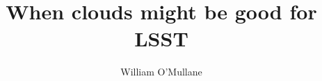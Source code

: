\documentclass[DM,TN,lsstdraft]{lsstdoc}
\title{When  clouds might be good  for LSST}
\author{%
William O'Mullane
}
\date{\vcsDate}
\begin{document}
\mkshorttitle


\appendix
\label{sec:bib}


%
\printglossaries
\end{document}

